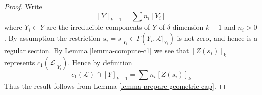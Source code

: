 \begin{proof}
Write
$$
[Y]_{k + 1} = \sum n_i[Y_i]
$$
where $Y_i \subset Y$ are the irreducible components of
$Y$ of $\delta$-dimension $k + 1$ and $n_i > 0$.
By assumption the restriction
$s_i = s|_{Y_i} \in \Gamma(Y_i, \mathcal{L}|_{Y_i})$ is not
zero, and hence is a regular section. By Lemma \ref{lemma-compute-c1}
we see that $[Z(s_i)]_k$ represents $c_1(\mathcal{L}|_{Y_i})$.
Hence by definition
$$
c_1(\mathcal{L}) \cap [Y]_{k + 1} = \sum n_i[Z(s_i)]_k
$$
Thus the result follows from Lemma \ref{lemma-prepare-geometric-cap}.
\end{proof}




